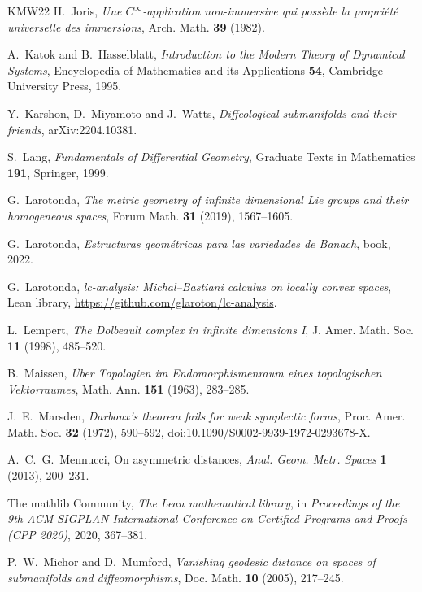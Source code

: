 \begin{thebibliography}{KMW22}
H.~Joris, \emph{Une $C^\infty$-application non-immersive qui possède la propriété universelle
des immersions}, Arch. Math. \textbf{39} (1982).

A.~Katok and B.~Hasselblatt, \emph{Introduction to the Modern Theory of Dynamical Systems},
Encyclopedia of Mathematics and its Applications \textbf{54}, Cambridge University Press, 1995.

Y.~Karshon, D.~Miyamoto and J.~Watts, \emph{Diffeological submanifolds and their friends},
arXiv:2204.10381.

S.~Lang, \emph{Fundamentals of Differential Geometry}, Graduate Texts in Mathematics
\textbf{191}, Springer, 1999.

G.~Larotonda, \emph{The metric geometry of infinite dimensional Lie groups and their
homogeneous spaces}, Forum Math. \textbf{31} (2019), 1567--1605.

G.~Larotonda, \emph{Estructuras geométricas para las variedades de Banach}, book, 2022.

G.~Larotonda, \emph{lc-analysis: Michal--Bastiani calculus on locally convex spaces}, Lean
library, \url{https://github.com/glaroton/lc-analysis}.

L.~Lempert, \emph{The Dolbeault complex in infinite dimensions I}, J. Amer. Math. Soc.
\textbf{11} (1998), 485--520.

B.~Maissen, \emph{Über Topologien im Endomorphismenraum eines topologischen Vektorraumes},
Math. Ann. \textbf{151} (1963), 283--285.

J.~E.~Marsden, \emph{Darboux's theorem fails for weak symplectic forms}, Proc. Amer. Math. Soc.
\textbf{32} (1972), 590--592, doi:10.1090/S0002-9939-1972-0293678-X.

A.~C.~G.~Mennucci, On asymmetric distances, \emph{Anal. Geom. Metr. Spaces} \textbf{1} (2013),
200--231.

The mathlib Community, \emph{The Lean mathematical library}, in \emph{Proceedings of the 9th ACM
SIGPLAN International Conference on Certified Programs and Proofs (CPP 2020)}, 2020, 367--381.

P.~W.~Michor and D.~Mumford, \emph{Vanishing geodesic distance on spaces of submanifolds and
diffeomorphisms}, Doc. Math. \textbf{10} (2005), 217--245.


\end{thebibliography}
